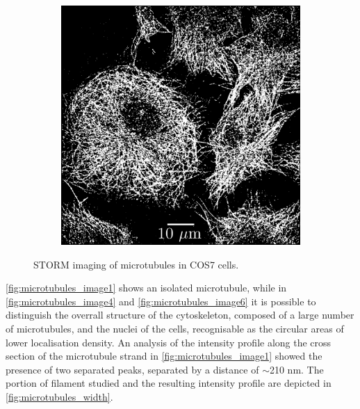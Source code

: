 \begin{figure}
\begin{subfigure}{0.32\textwidth}
        \caption{}
        \label{fig:microtubules_image4}
    \end{subfigure}
    \begin{subfigure}{0.32\textwidth}
        \includegraphics[width=\textwidth]{figures/microtubules_image6.png}
        \caption{}
        \label{fig:microtubules_image6}
    \end{subfigure}
    \caption{STORM imaging of microtubules in COS7 cells.}
    \label{fig:microtubules_images}
\end{figure}
%
\autoref{fig:microtubules_image1} shows an isolated microtubule, while in \autoref{fig:microtubules_image4} and \autoref{fig:microtubules_image6} it is possible to distinguish the overrall structure of the cytoskeleton, composed of a large number of microtubules, and the nuclei of the cells, recognisable as the circular areas of lower localisation density.
An analysis of the intensity profile along the cross section of the microtubule strand in \autoref{fig:microtubules_image1} showed the presence of two separated peaks, separated by a distance of $\sim$210 nm.
The portion of filament studied and the resulting intensity profile are depicted in \autoref{fig:microtubules_width}.
%
